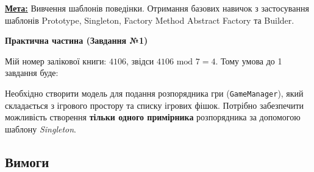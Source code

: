 \documentclass[12pt,a4paper]{article}
\begin{document}
    \vspace{1em}

    \textbf{\underline{Мета:}} Вивчення шаблонів поведінки. Отримання базових навичок з застосування
шаблонів Prototype, Singleton, Factory Method Abstract Factory та Builder.

    \begin{center} \textbf{\Large Практична частина (Завдання №1)} \end{center}

    \setlength{\parindent}{1.5em}

    Мій номер залікової книги: $4106$, звідси $4106 \text{ mod } 7 = 4$. Тому умова до 1 завдання буде:

    Необхідно створити модель для подання розпорядника гри (\texttt{GameManager}), 
    який складається з ігрового простору та списку ігрових фішок. 
    Потрібно забезпечити можливість створення \textbf{тільки одного примірника} 
    розпорядника за допомогою шаблону \textit{Singleton}.

    \subsection*{Вимоги}
\end{document}

